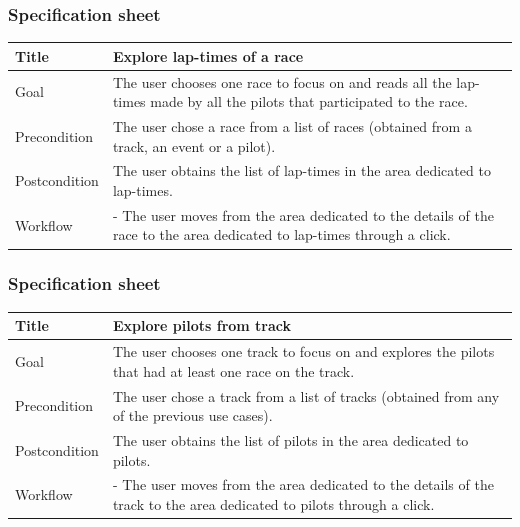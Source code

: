 \documentclass{beamer}
\begin{document}
\begin{frame}
    \frametitle{Specification sheet}
    \begin{table}
        \tiny
        \begin{tabular}{|p{2cm}|p{6cm}|}
        \hline
        Title & \textbf{Explore lap-times of a race} \\
        \hline
        Goal & The user chooses one race to focus on and reads all the lap-times made by all the pilots 
        that participated to the race.\\
        \hline
        Precondition & The user chose a race from a list of races (obtained from a track, an event or a pilot).\\
        \hline
        Postcondition & The user obtains the list of lap-times in the area dedicated to lap-times. \\
        \hline
        Workflow &
        - The user moves from the area dedicated to the details of the race to the
        area dedicated to lap-times through a click. \\
        \hline
        \end{tabular}
\end{table}
\end{frame}

\begin{frame}
    \frametitle{Specification sheet}
    \begin{table}
        \tiny
        \begin{tabular}{|p{2cm}|p{6cm}|}
        \hline
        Title & \textbf{Explore pilots from track} \\
        \hline
        Goal & The user chooses one track to focus on and explores the pilots that had at least one race on the track. \\
        \hline
        Precondition & The user chose a track from a list of tracks (obtained from any of the previous use cases).\\
        \hline
        Postcondition & The user obtains the list of pilots in the area dedicated to pilots. \\
        \hline
        Workflow &
        - The user moves from the area dedicated to the details of the track to the
        area dedicated to pilots through a click. \\
        \hline
        \end{tabular}
\end{table}
\end{frame}
\end{document}
